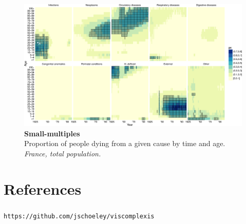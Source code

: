 \documentclass{beamer}
\begin{document}
\begin{frame}
\frametitle{\insertsection}

\begin{figure}[htb!]
\includegraphics[width = \textwidth]{../fig/talk/small_multiples.pdf}\\
\scriptsize \textbf{Small-multiples}\\ Proportion of people dying from a given cause by time and age. \tiny\emph{France, total population.}
\end{figure}

\end{frame}

\section{References} %

\begin{frame}
\frametitle{\insertsection}

\begin{centering}

\Large{}

\smallskip

\Large\texttt{https://github.com/jschoeley/viscomplexis}

\end{centering}

\end{frame}


\begin{frame}
\frametitle{\insertsection}

\nocite{MOLAST2000}

\printbibliography

\end{frame}
\end{document}

